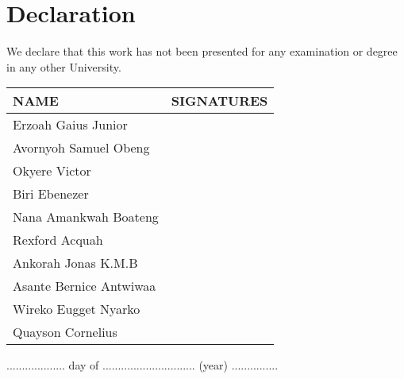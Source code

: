 
\section*{\centering Declaration}


We declare that this work has not been presented for any examination or degree in any other University.


\vspace{1cm}

\begin{tabular}{|l|c |}
	\hline
	NAME & SIGNATURES \\ \hline
	Erzoah Gaius Junior &   \\ \hline
	Avornyoh Samuel Obeng & 	\\ \hline
	Okyere Victor &		\\ \hline
	Biri Ebenezer & 	\\ \hline
	Nana Amankwah Boateng & \\ \hline
	Rexford Acquah & \\ \hline
	Ankorah Jonas K.M.B & \\ \hline
	Asante Bernice Antwiwaa & \\ \hline
	Wireko Eugget Nyarko & \\ \hline
	Quayson Cornelius & \\ \hline



\end{tabular}

\vspace{1cm}
................... day of .............................. (year) ...............